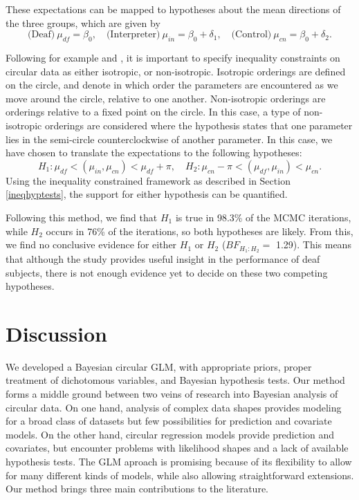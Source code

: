 \documentclass[11pt,a4paper]{article}\usepackage[]{graphicx}\usepackage[]{color}
\begin{document}
These expectations can be mapped to hypotheses about the mean directions of the three groups, which are given by \[  \text{(Deaf)} ~ \mu_{df} = \beta_0, \quad \text{(Interpreter)} ~ \mu_{in} =  \beta_0 + \delta_1, \quad \text{(Control)} ~ \mu_{cn} = \beta_0 + \delta_2.\]

Following for example \citet{rueda2009estimation} and \citet{baayen2014evaluating}, it is important to specify inequality constraints on circular data as either isotropic, or non-isotropic. Isotropic orderings are defined on the circle, and denote in which order the parameters are encountered as we move around the circle, relative to one another. Non-isotropic orderings are orderings relative to a fixed point on the circle. In this case, a type of non-isotropic orderings are considered where the hypothesis states that one parameter lies in the semi-circle counterclockwise of another parameter. In this case, we have chosen to translate the expectations to the following hypotheses:
\begin{equation}
H_1 : \mu_{df} < (\mu_{in}, \mu_{cn}) < \mu_{df} + \pi, \quad H_2 :  \mu_{cn} - \pi < (\mu_{df}, \mu_{in}) < \mu_{cn}.
\end{equation}
Using the inequality constrained framework as described in Section \ref{ineqhyptests}, the support for either hypothesis can be quantified.



Following this method, we find that \( H_1 \) is true in 98.3\% of the MCMC iterations, while \( H_2 \)  occurs in 76\% of the iterations, so both hypotheses are likely. From this, we find no conclusive evidence for either \( H_1 \) or \( H_2 \) (\( BF_{H_1:H_2} =\) 1.29). This means that although the study provides useful insight in the performance of deaf subjects, there is not enough evidence yet to decide on these two competing hypotheses.


\section{Discussion}

\label{discussion}


We developed a Bayesian circular GLM, with appropriate priors, proper treatment of dichotomous variables, and Bayesian hypothesis tests. Our method forms a middle ground between two veins of research into Bayesian analysis of circular data. On one hand, analysis of complex data shapes \citep{ghosh2003semiparametric, ferreira2008directional, fernandez2016bayesian} provides modeling for a broad class of datasets but few possibilities for prediction and covariate models. On the other hand, circular regression models \citep{fisher1992regression, gill2010, lagona2015regression} provide prediction and covariates, but encounter problems with likelihood shapes and a lack of available hypothesis tests. The GLM aproach is promising because of its flexibility to allow for many different kinds of models, while also allowing straightforward extensions. Our method brings three main contributions to the literature.
\end{document}
